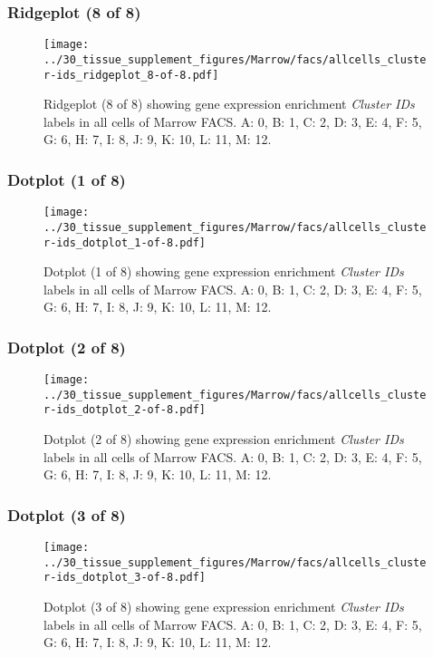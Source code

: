 \clearpage

\subsubsection{Ridgeplot (8 of 8)}
\begin{figure}[h]
\centering
\texttt{[image: ../30\_tissue\_supplement\_figures/Marrow/facs/allcells\_cluster-ids\_ridgeplot\_8-of-8.pdf]}

\caption{ Ridgeplot (8 of 8)  showing gene expression enrichment \emph{Cluster IDs} labels in all cells of Marrow FACS. A: 0, B: 1, C: 2, D: 3, E: 4, F: 5, G: 6, H: 7, I: 8, J: 9, K: 10, L: 11, M: 12.}
\end{figure}


\clearpage

\subsubsection{Dotplot (1 of 8)}
\begin{figure}[h]
\centering
\texttt{[image: ../30\_tissue\_supplement\_figures/Marrow/facs/allcells\_cluster-ids\_dotplot\_1-of-8.pdf]}

\caption{ Dotplot (1 of 8)  showing gene expression enrichment \emph{Cluster IDs} labels in all cells of Marrow FACS. A: 0, B: 1, C: 2, D: 3, E: 4, F: 5, G: 6, H: 7, I: 8, J: 9, K: 10, L: 11, M: 12.}
\end{figure}


\clearpage

\subsubsection{Dotplot (2 of 8)}
\begin{figure}[h]
\centering
\texttt{[image: ../30\_tissue\_supplement\_figures/Marrow/facs/allcells\_cluster-ids\_dotplot\_2-of-8.pdf]}

\caption{ Dotplot (2 of 8)  showing gene expression enrichment \emph{Cluster IDs} labels in all cells of Marrow FACS. A: 0, B: 1, C: 2, D: 3, E: 4, F: 5, G: 6, H: 7, I: 8, J: 9, K: 10, L: 11, M: 12.}
\end{figure}


\clearpage

\subsubsection{Dotplot (3 of 8)}
\begin{figure}[h]
\centering
\texttt{[image: ../30\_tissue\_supplement\_figures/Marrow/facs/allcells\_cluster-ids\_dotplot\_3-of-8.pdf]}

\caption{ Dotplot (3 of 8)  showing gene expression enrichment \emph{Cluster IDs} labels in all cells of Marrow FACS. A: 0, B: 1, C: 2, D: 3, E: 4, F: 5, G: 6, H: 7, I: 8, J: 9, K: 10, L: 11, M: 12.}
\end{figure}


